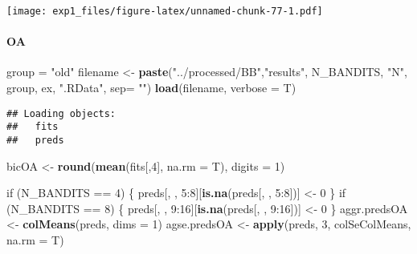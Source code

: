 \documentclass[11pt,,]{article}
\newenvironment{Shaded}{\begin{snugshade}}{\end{snugshade}}
\newcommand{\KeywordTok}[1]{\textcolor[rgb]{0.13,0.29,0.53}{\textbf{{#1}}}}
\newcommand{\DataTypeTok}[1]{\textcolor[rgb]{0.13,0.29,0.53}{{#1}}}
\newcommand{\DecValTok}[1]{\textcolor[rgb]{0.00,0.00,0.81}{{#1}}}
\newcommand{\StringTok}[1]{\textcolor[rgb]{0.31,0.60,0.02}{{#1}}}
\newcommand{\NormalTok}[1]{{#1}}
\let\oldparagraph\paragraph
\renewcommand{\paragraph}[1]{\oldparagraph{#1}\mbox{}}
\begin{document}
\texttt{[image: exp1\_files/figure-latex/unnamed-chunk-77-1.pdf]}

\newpage

\paragraph{OA}\label{oa-1}

\begin{Shaded}
\begin{Highlighting}[]
\NormalTok{group =}\StringTok{ "old"}
\NormalTok{filename  <-}\StringTok{ }\KeywordTok{paste}\NormalTok{(}\StringTok{"../processed/BB"}\NormalTok{,}\StringTok{"results"}\NormalTok{, N_BANDITS, }\StringTok{"N"}\NormalTok{, }
                   \NormalTok{group, ex, }\StringTok{".RData"}\NormalTok{, }\DataTypeTok{sep=} \StringTok{""}\NormalTok{)}
\KeywordTok{load}\NormalTok{(filename, }\DataTypeTok{verbose =} \NormalTok{T)}
\end{Highlighting}
\end{Shaded}

\begin{verbatim}
## Loading objects:
##   fits
##   preds
\end{verbatim}

\begin{Shaded}
\begin{Highlighting}[]
\NormalTok{bicOA <-}\StringTok{ }\KeywordTok{round}\NormalTok{(}\KeywordTok{mean}\NormalTok{(fits[,}\DecValTok{4}\NormalTok{], }\DataTypeTok{na.rm =} \NormalTok{T), }\DataTypeTok{digits =} \DecValTok{1}\NormalTok{)}

\NormalTok{if (N_BANDITS ==}\StringTok{ }\DecValTok{4}\NormalTok{) \{}
    \NormalTok{preds[, , }\DecValTok{5}\NormalTok{:}\DecValTok{8}\NormalTok{][}\KeywordTok{is.na}\NormalTok{(preds[, , }\DecValTok{5}\NormalTok{:}\DecValTok{8}\NormalTok{])] <-}\StringTok{ }\DecValTok{0}
\NormalTok{\}}
\NormalTok{if (N_BANDITS ==}\StringTok{ }\DecValTok{8}\NormalTok{) \{}
    \NormalTok{preds[, , }\DecValTok{9}\NormalTok{:}\DecValTok{16}\NormalTok{][}\KeywordTok{is.na}\NormalTok{(preds[, , }\DecValTok{9}\NormalTok{:}\DecValTok{16}\NormalTok{])] <-}\StringTok{ }\DecValTok{0}
\NormalTok{\}}
\NormalTok{aggr.predsOA <-}\StringTok{ }\KeywordTok{colMeans}\NormalTok{(preds, }\DataTypeTok{dims =} \DecValTok{1}\NormalTok{) }
\NormalTok{agse.predsOA <-}\StringTok{ }\KeywordTok{apply}\NormalTok{(preds, }\DecValTok{3}\NormalTok{, colSeColMeans, }\DataTypeTok{na.rm =} \NormalTok{T) }
\end{Highlighting}
\end{Shaded}
\end{document}
